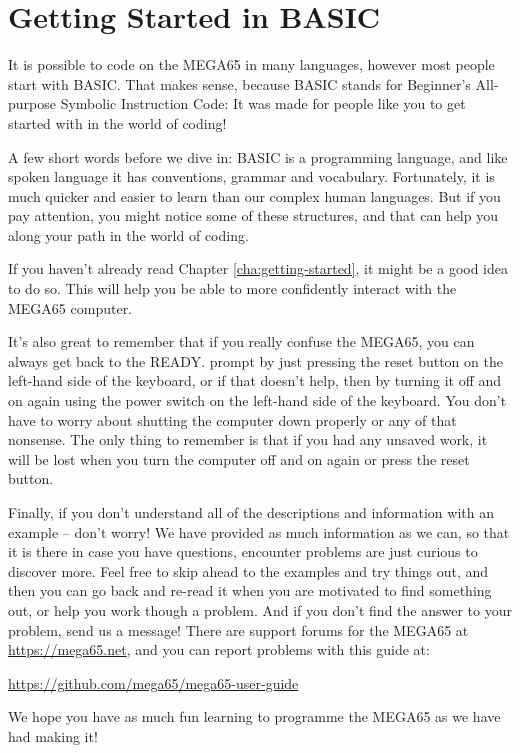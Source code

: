 \chapter{Getting Started in BASIC}
\label{cha:basic-getting-started}

It is possible to code on the MEGA65 in many languages,
however most people start with BASIC.  That makes sense,
because BASIC stands for Beginner's All-purpose Symbolic
Instruction Code: It was made for people like you to get
started with in the world of coding!

A few short words before we dive in: BASIC is a programming
language, and like spoken language it has conventions, grammar
and vocabulary.  Fortunately, it is much quicker and easier
to learn than our complex human languages. But if you pay
attention, you might notice some of these structures, and that
can help you along your path in the world of coding.

If you haven't already read Chapter \ref{cha:getting-started},
it might be a good idea to do so. This will help you be able to
more confidently interact with the MEGA65 computer.

It's also great to remember that if you really confuse the MEGA65,
you can always get back to the READY. prompt by just pressing the
reset button on the left-hand side of the keyboard, or if that
doesn't help, then by turning it off
and on again using the power switch on the left-hand side of the keyboard.
You don't have to worry about shutting the computer
down properly or any of that nonsense.  The only thing to remember
is that if you had any unsaved work, it will be lost when you turn
the computer off and on again or press the reset button.

Finally, if you don't understand all of the descriptions and information
with an example -- don't worry! We have provided as much information
as we can, so that it is there in case you have questions, encounter problems are
just curious to discover more.  Feel free to skip ahead to the examples
and try things out, and then you can go back and re-read it when you are motivated
to find something out, or help you work though a problem.  And if you don't find
the answer to your problem, send us a message!  There are support forums for the
MEGA65 at \url{https://mega65.net}, and you can
report problems with this guide at:

\url{https://github.com/mega65/mega65-user-guide}

We hope you have as much fun learning to programme the MEGA65 as
we have had making it!

